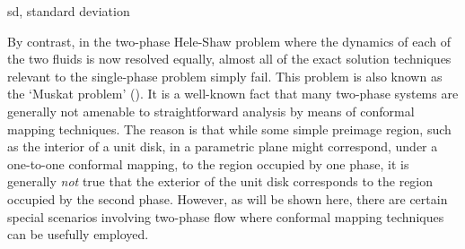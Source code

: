 \documentclass[fleqn]{jleo}
\begin{document}
\begin{table}[t!]%
\vspace*{-14pt}
\caption{Log odds ratios (OR) from a Bayesian logistic regression on the best ML model for the Sarcoidosis study}
{\fontsize{6}{8}\selectfont\sffamily sd, standard deviation}\label{tab04}
\end{table}

By contrast, in the two-phase Hele-Shaw problem where the dynamics of each
of the two fluids is now resolved equally, almost all of the exact solution techniques relevant to the single-phase problem simply fail. This problem
is also known as the `Muskat problem' (\citealt{Muskat}). It is a well-known fact
that many two-phase systems are generally not amenable to straightforward
analysis by means of conformal mapping techniques. The reason is that while
some simple preimage region, such as the interior of a unit disk,  in a parametric
plane might correspond, under a one-to-one conformal mapping,  to the region
occupied by one phase, it is generally {\em not} true that the exterior of
the unit disk corresponds to the region occupied by the second phase. However,
as will be shown here, there are certain special scenarios involving two-phase
flow where conformal mapping techniques can be usefully employed.
\end{document}
